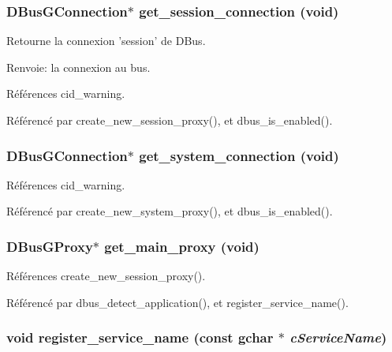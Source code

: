\subsubsection{\setlength{\rightskip}{0pt plus 5cm}DBusGConnection$\ast$ get\_\-session\_\-connection (void)}\label{cid-dbus_8c_cf6fd43bd35fb86e41c280919db53b26}


Retourne la connexion 'session' de DBus. \begin{Desc}
\item[Renvoie:]la connexion au bus. \end{Desc}


Références cid\_\-warning.

Référencé par create\_\-new\_\-session\_\-proxy(), et dbus\_\-is\_\-enabled().
\subsubsection{\setlength{\rightskip}{0pt plus 5cm}DBusGConnection$\ast$ get\_\-system\_\-connection (void)}\label{cid-dbus_8c_698e771d9ee79928b65637ef68c6616c}




Références cid\_\-warning.

Référencé par create\_\-new\_\-system\_\-proxy(), et dbus\_\-is\_\-enabled().
\subsubsection{\setlength{\rightskip}{0pt plus 5cm}DBusGProxy$\ast$ get\_\-main\_\-proxy (void)}\label{cid-dbus_8c_07a494821139b2f3db60d88b3a5381f5}




Références create\_\-new\_\-session\_\-proxy().

Référencé par dbus\_\-detect\_\-application(), et register\_\-service\_\-name().
\subsubsection{\setlength{\rightskip}{0pt plus 5cm}void register\_\-service\_\-name (const gchar $\ast$ {\em cServiceName})}\label{cid-dbus_8c_6c35ea284d5021681d6042d3a92194f0}


